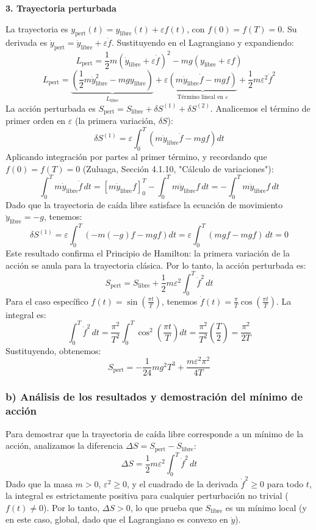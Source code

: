 \documentclass[a4paper]{article}
\begin{document}
\textbf{3. Trayectoria perturbada}

La trayectoria es $y_{\text{pert}}(t) = y_{\text{libre}}(t) + \varepsilon f(t)$, con $f(0)=f(T)=0$. Su derivada es $\dot{y}_{\text{pert}} = \dot{y}_{\text{libre}} + \varepsilon \dot{f}$.
Sustituyendo en el Lagrangiano y expandiendo:
$$L_{\text{pert}} = \frac{1}{2}m(\dot{y}_{\text{libre}} + \varepsilon \dot{f})^2 - mg(y_{\text{libre}} + \varepsilon f)$$
$$L_{\text{pert}} = \underbrace{\left( \frac{1}{2}m\dot{y}_{\text{libre}}^2 - mgy_{\text{libre}} \right)}_{L_{\text{libre}}} + \varepsilon \underbrace{\left( m\dot{y}_{\text{libre}}\dot{f} - mgf \right)}_{\text{Término lineal en } \varepsilon} + \frac{1}{2}m\varepsilon^2\dot{f}^2$$
La acción perturbada es $S_{\text{pert}} = S_{\text{libre}} + \delta S^{(1)} + \delta S^{(2)}$. Analicemos el término de primer orden en $\varepsilon$ (la primera variación, $\delta S$):
$$\delta S^{(1)} = \varepsilon \int_{0}^{T} \left( m\dot{y}_{\text{libre}}\dot{f} - mgf \right) dt$$
Aplicando integración por partes al primer término, y recordando que $f(0)=f(T)=0$ (Zuluaga, Sección 4.1.10, "Cálculo de variaciones"):
$$\int_{0}^{T} m\dot{y}_{\text{libre}}\dot{f} \, dt = \left[ m\dot{y}_{\text{libre}}f \right]_{0}^{T} - \int_{0}^{T} m\ddot{y}_{\text{libre}}f \, dt = - \int_{0}^{T} m\ddot{y}_{\text{libre}}f \, dt$$
Dado que la trayectoria de caída libre satisface la ecuación de movimiento $\ddot{y}_{\text{libre}} = -g$, tenemos:
$$\delta S^{(1)} = \varepsilon \int_{0}^{T} \left( -m(-g)f - mgf \right) dt = \varepsilon \int_{0}^{T} (mgf - mgf) \, dt = 0$$
Este resultado confirma el Principio de Hamilton: la primera variación de la acción se anula para la trayectoria clásica. Por lo tanto, la acción perturbada es:
$$S_{\text{pert}} = S_{\text{libre}} + \frac{1}{2}m\varepsilon^2 \int_{0}^{T} \dot{f}^2 \, dt$$
Para el caso específico $f(t) = \sin\left(\frac{\pi t}{T}\right)$, tenemos $\dot{f}(t) = \frac{\pi}{T}\cos\left(\frac{\pi t}{T}\right)$. La integral es:
$$\int_{0}^{T} \dot{f}^2 \, dt = \frac{\pi^2}{T^2} \int_{0}^{T} \cos^2\left(\frac{\pi t}{T}\right) dt = \frac{\pi^2}{T^2} \left( \frac{T}{2} \right) = \frac{\pi^2}{2T}$$
Sustituyendo, obtenemos:
$$S_{\text{pert}} = -\frac{1}{24}mg^2T^3 + \frac{m\varepsilon^2\pi^2}{4T}$$

\subsubsection*{b) Análisis de los resultados y demostración del mínimo de acción}

Para demostrar que la trayectoria de caída libre corresponde a un mínimo de la acción, analizamos la diferencia $\Delta S = S_{\text{pert}} - S_{\text{libre}}$:
$$\Delta S = \frac{1}{2}m\varepsilon^2 \int_{0}^{T} \dot{f}^2 \, dt$$
Dado que la masa $m > 0$, $\varepsilon^2 \ge 0$, y el cuadrado de la derivada $\dot{f}^2 \ge 0$ para todo $t$, la integral es estrictamente positiva para cualquier perturbación no trivial ($f(t) \neq 0$). Por lo tanto, $\Delta S > 0$, lo que prueba que $S_{\text{libre}}$ es un mínimo local (y en este caso, global, dado que el Lagrangiano es convexo en $\dot{y}$).
\end{document}
